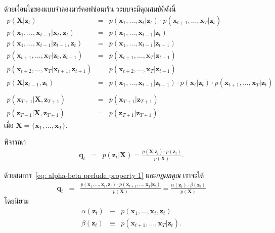 ด้วยเงื่อนไขของแบบจำลองมาร์คอฟซ่อนเร้น 
ระบบจะมีคุณสมบัติดังนี้
%
\begin{eqnarray}
p(\bm{X}|\bm{z}_t)
&=& p(\bm{x}_1, \ldots, \bm{x}_t|\bm{z}_t) \cdot p(\bm{x}_{t+1}, \ldots, \bm{x}_T|\bm{z}_t)
\label{eq: alpha-beta prelude property 1} \\
p(\bm{x}_1, \ldots, \bm{x}_{t-1}|\bm{x}_t, \bm{z}_t)
&=& p(\bm{x}_1, \ldots, \bm{x}_{t-1}|\bm{z}_t)
\label{eq: alpha-beta prelude property 2} \\
p(\bm{x}_1, \ldots, \bm{x}_{t-1}|\bm{z}_{t-1}, \bm{z}_t)
&=& p(\bm{x}_1, \ldots, \bm{x}_{t-1}|\bm{z}_{t-1})
\label{eq: alpha-beta prelude property 3} \\
p(\bm{x}_{t+1}, \ldots, \bm{x}_T|\bm{z}_t, \bm{z}_{t+1})
&=& p(\bm{x}_{t+1}, \ldots, \bm{x}_T|\bm{z}_{t+1})
\label{eq: alpha-beta prelude property 4} \\
p(\bm{x}_{t+2}, \ldots, \bm{x}_T|\bm{x}_{t+1}, \bm{z}_{t+1})
&=& p(\bm{x}_{t+2}, \ldots, \bm{x}_T|\bm{z}_{t+1})
\label{eq: alpha-beta prelude property 5} \\
p(\bm{X}|\bm{z}_{t-1}, \bm{z}_{t})
&=& p(\bm{x}_{1}, \ldots, \bm{x}_{t-1}|\bm{z}_{t-1})
\cdot p(\bm{x}_t|\bm{z}_t) \cdot p(\bm{x}_{t+1}, \ldots, \bm{x}_{T}|\bm{z}_{t})
\nonumber \\
\label{eq: alpha-beta prelude property 6} \\
p(\bm{x}_{T+1}|\bm{X}, \bm{z}_{T+1})
&=& p(\bm{x}_{T+1}|\bm{z}_{T+1})
\label{eq: alpha-beta prelude property 7} \\
p(\bm{z}_{T+1}|\bm{X}, \bm{z}_{T+1})
&=& p(\bm{z}_{T+1}|\bm{z}_{T+1})
\label{eq: alpha-beta prelude property 8} 
%
\end{eqnarray}
เมื่อ $\bm{X} = \{ \bm{x}_1, \ldots, \bm{x}_T \}$.

พิจารณา 
\begin{eqnarray}
\bm{q}_t &=& p(\bm{z}_t|\bm{X}) = \frac{p(\bm{X}|\bm{z}_t) \cdot p(\bm{z}_t)}{p(\bm{X})}
\label{eq: alpha-beta q}.
\end{eqnarray}

ด้วยสมการ~\ref{eq: alpha-beta prelude property 1} และ\textit{กฎผลคูณ}
เราจะได้
\begin{eqnarray}
\bm{q}_t 
&=& \frac{p(\bm{x}_1, \ldots, \bm{x}_t,\bm{z}_t) \cdot p(\bm{x}_{t+1}, \ldots, \bm{x}_T|\bm{z}_t)}{p(\bm{X})}
= \frac{\alpha(\bm{z}_t) \cdot \beta(\bm{z}_t) }{p(\bm{X})}
\label{eq: alpha-beta q alpha beta}
\end{eqnarray}
โดยนิยาม
\begin{eqnarray}
\alpha(\bm{z}_t)
& \equiv & p(\bm{x}_1, \ldots, \bm{x}_t, \bm{z}_t)
\label{eq: alpha-beta alpha} \\
\beta(\bm{z}_t)
& \equiv & p(\bm{x}_{t+1}, \ldots, \bm{x}_T| \bm{z}_t)
\label{eq: alpha-beta beta}.
\end{eqnarray}

